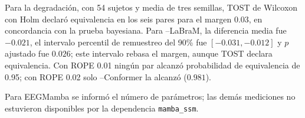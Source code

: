 Para la degradación, con 54 sujetos y media de tres semillas, TOST de Wilcoxon con Holm declaró equivalencia en los seis pares para el margen 0.03, en concordancia con la prueba bayesiana. Para \eegnet{}--LaBraM, la diferencia media fue $-0.021$, el intervalo percentil de remuestreo del 90\% fue $[-0.031, -0.012]$ y $p$ ajustado fue $0.026$; este intervalo rebasa el margen, aunque TOST declara equivalencia. Con ROPE 0.01 ningún par alcanzó probabilidad de equivalencia de 0.95; con ROPE 0.02 solo \eegnet{}--Conformer la alcanzó ($0.981$).
\begin{table}[htbp]\centering\small
\caption{Costo de inferencia con 62 canales. Latencias medianas en ms para lote 1; memoria pico CUDA en MB para lote 64. El contador cubre las operaciones compatibles.}
\end{table}
Para EEGMamba se informó el número de parámetros; las demás mediciones no estuvieron disponibles por la dependencia \texttt{mamba\_ssm}.
